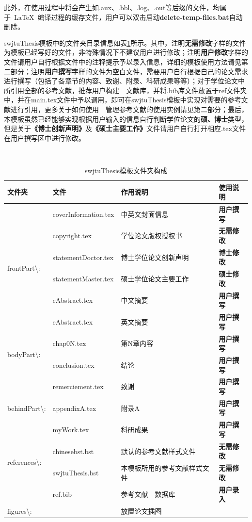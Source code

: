 此外，在使用过程中将会产生如.aux、.bbl、.log、.out等后缀的文件，均属于~\LaTeX{}~编译过程的缓存文件，用户可以双击启动\textbf{delete-temp-files.bat}自动删除。

swjtuThesis模板中的文件夹目录信息如表\ref{tab_1_1_files}所示。其中，注明\textbf{无需修改}字样的文件为模板已经写好的文件，非特殊情况下不建议用户进行修改；注明\textbf{用户修改}字样的文件请用户自行根据文件中的注释提示予以录入信息，详细的模板使用方法请见第二部分；注明\textbf{用户撰写}字样的文件为空白文件，需要用户自行根据自己的论文需求进行撰写（包括了各章节的内容、致谢、附录、科研成果等等）；对于学位论文中所引用全部的参考文献，推荐用户构建~\BibTeX~文献库，并将.bib库文件放置于ref文件夹中，并在main.tex文件中予以调用，即可在swjtuThesis模板中实现对需要的参考文献进行引用，更多关于如何使用~\BibTeX~管理参考文献的使用实例请见第二部分；最后，本模板虽然已经能够实现根据用户输入的信息自行判断学位论文的\textbf{硕、博士}类型，但是关于\textbf{《博士创新声明》}及\textbf{《硕士主要工作》}文件请用户自行打开相应.tex文件在用户撰写区中进行修改。

\begin{table}[htbp]
	\setlength{\abovecaptionskip}{0pt}
	\setlength{\belowcaptionskip}{0pt}\
	\caption{swjtuThesis模板文件夹构成}
	\label{tab_1_1_files}
	\centering
	\begin{tabular}{llll}
		\toprule
		文件夹 & 文件 & 作用说明 & 使用说明 \\
		\midrule
		\multirow{6}{*}{\centering frontPart\textbackslash{}:}
            & coverInformation.tex & 中英文封面信息 & \textbf{用户撰写} \\
            & copyright.tex & 学位论文版权授权书 & \textbf{无需修改} \\
		& statementDoctor.tex & 博士学位论文创新声明 & \textbf{博士修改} \\
		& statementMaster.tex & 硕士学位论文主要工作 & \textbf{硕士修改} \\
		& cAbstract.tex & 中文摘要 & \textbf{用户撰写} \\
		& eAbstract.tex & 英文摘要 & \textbf{用户撰写} \\
		\midrule
		\multirow{2}{*}{\centering bodyPart\textbackslash{}:} & chap0N.tex & 第N章内容 & \textbf{用户撰写} \\
		& conclusion.tex & 结论 & \textbf{用户撰写} \\
		\midrule
		\multirow{3}{*}{\centering behindPart\textbackslash{}:} & remerciement.tex & 致谢 & \textbf{用户撰写} \\
		& appendixA.tex & 附录A & \textbf{用户撰写} \\
		& myWork.tex & 科研成果 & \textbf{用户撰写} \\
		\midrule
		\multirow{2}{*}{\centering references\textbackslash{}:} & chinesebst.bst & 默认的参考文献样式文件 & \textbf{无需修改} \\
		& swjtuThesis.bst & 本模板所用的参考文献样式文件 & \textbf{无需修改} \\
		& ref.bib & 参考文献~\BibTeX~数据库 & \textbf{用户录入}\\
		\midrule
		figures\textbackslash{}: &  & 放置论文插图 \\
		\bottomrule
	\end{tabular}
\end{table}
